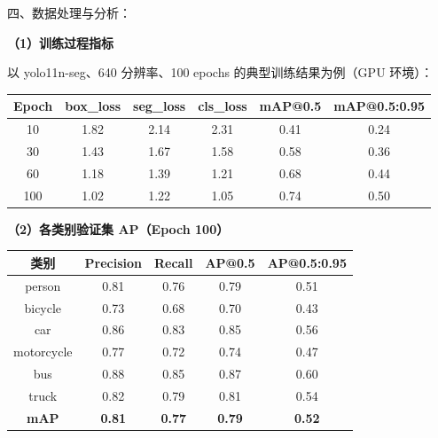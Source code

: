 \documentclass[12pt, a4paper]{article}
\begin{document}
\begin{labbox}{四、数据处理与分析：}{}

\textbf{（1）训练过程指标}

以 yolo11n-seg、640 分辨率、100 epochs 的典型训练结果为例（GPU 环境）：

\vspace{0.3cm}
\begin{center}
\begin{tabular}{|c|c|c|c|c|c|}
    \hline
    \textbf{Epoch} & \textbf{box\_loss} & \textbf{seg\_loss} & \textbf{cls\_loss}
        & \textbf{mAP@0.5} & \textbf{mAP@0.5:0.95} \\
    \hline
    10  & 1.82 & 2.14 & 2.31 & 0.41 & 0.24 \\
    30  & 1.43 & 1.67 & 1.58 & 0.58 & 0.36 \\
    60  & 1.18 & 1.39 & 1.21 & 0.68 & 0.44 \\
    100 & 1.02 & 1.22 & 1.05 & 0.74 & 0.50 \\
    \hline
\end{tabular}
\end{center}
\vspace{0.3cm}

\textbf{（2）各类别验证集 AP（Epoch 100）}

\vspace{0.3cm}
\begin{center}
\begin{tabular}{|c|c|c|c|c|}
    \hline
    \textbf{类别} & \textbf{Precision} & \textbf{Recall}
        & \textbf{AP@0.5} & \textbf{AP@0.5:0.95} \\
    \hline
    person     & 0.81 & 0.76 & 0.79 & 0.51 \\
    bicycle    & 0.73 & 0.68 & 0.70 & 0.43 \\
    car        & 0.86 & 0.83 & 0.85 & 0.56 \\
    motorcycle & 0.77 & 0.72 & 0.74 & 0.47 \\
    bus        & 0.88 & 0.85 & 0.87 & 0.60 \\
    truck      & 0.82 & 0.79 & 0.81 & 0.54 \\
    \hline
    \textbf{mAP} & \textbf{0.81} & \textbf{0.77} & \textbf{0.79} & \textbf{0.52} \\
    \hline
\end{tabular}
\end{center}
\vspace{0.3cm}


\end{labbox}
\end{document}
